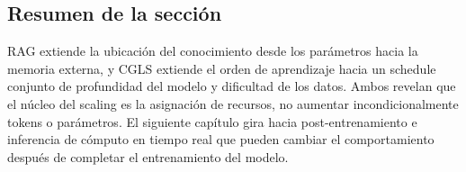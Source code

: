 \subsection{Resumen de la sección}

RAG extiende la ubicación del conocimiento desde los parámetros hacia la memoria externa, y CGLS extiende el orden de aprendizaje hacia un schedule conjunto de profundidad del modelo y dificultad de los datos. Ambos revelan que el núcleo del scaling es la asignación de recursos, no aumentar incondicionalmente tokens o parámetros. El siguiente capítulo gira hacia post-entrenamiento e inferencia de cómputo en tiempo real que pueden cambiar el comportamiento después de completar el entrenamiento del modelo.

